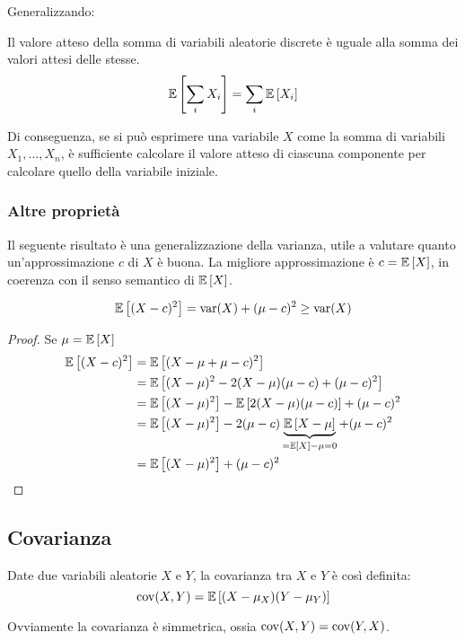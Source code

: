 Generalizzando:
\begin{prop}
	Il valore atteso della somma di variabili aleatorie discrete è uguale alla somma dei valori attesi delle stesse.
	\begin{equation*}
		\mathbb{E}\left[ \sum_i X_i \right]=\sum_i \mathbb{E}\left[ X_i \right]
	\end{equation*}
\end{prop}

Di conseguenza, se si può esprimere una variabile $X$ come la somma di variabili $X_1,\dots,X_n$, è sufficiente calcolare il valore atteso di ciascuna componente per calcolare quello della variabile iniziale.


\subsubsection{Altre proprietà}
Il seguente risultato è una generalizzazione della varianza, utile a valutare quanto un'approssimazione $c$ di $X$ è buona. La migliore approssimazione è $c=\mathbb{E}\left[ X \right]$, in coerenza con il senso semantico di $\mathbb{E}\left[ X \right]$.
\begin{prop}
	\begin{equation*}
		\mathbb{E}\left[ (X-c)^2 \right]=\operatorname{var}(X)+(\mu-c)^2\geq\operatorname{var}(X)
	\end{equation*}
\end{prop}
\begin{proof}
	Se $\mu=\mathbb{E}\left[ X \right]$
	\begin{align*}
		\mathbb{E}\left[ (X-c)^2 \right] & = \mathbb{E}\left[ (X-\mu+\mu-c)^2 \right]                                                     \\
		             & = \mathbb{E}\left[ (X-\mu)^2-2(X-\mu)(\mu-c)+(\mu-c)^2 \right]                                 \\
		             & = \mathbb{E}\left[ (X-\mu)^2 \right]-\mathbb{E}\left[ 2(X-\mu)(\mu-c) \right]+(\mu-c)^2                            \\
		             & = \mathbb{E}\left[ (X-\mu)^2 \right]-2(\mu-c)\underbrace{\mathbb{E}\left[ X-\mu \right]}_{=\mathbb{E}\left[ X \right]-\mu=0}+(\mu-c)^2 \\
		             & = \mathbb{E}\left[ (X-\mu)^2 \right]+(\mu-c)^2
	\end{align*}
\end{proof}



\subsection{Covarianza}

\begin{defin}
	Date due variabili aleatorie $X$ e $Y$, la covarianza tra $X$ e $Y$ è così definita:
	\begin{equation} \label{eq:covar}
		\operatorname{cov}(X,Y)=\mathbb{E}\left[ (X-\mu_X)(Y-\mu_Y) \right]
	\end{equation}
\end{defin}
\noindent
Ovviamente la covarianza è simmetrica, ossia $\operatorname{cov}(X,Y)=\operatorname{cov}(Y,X)$.


